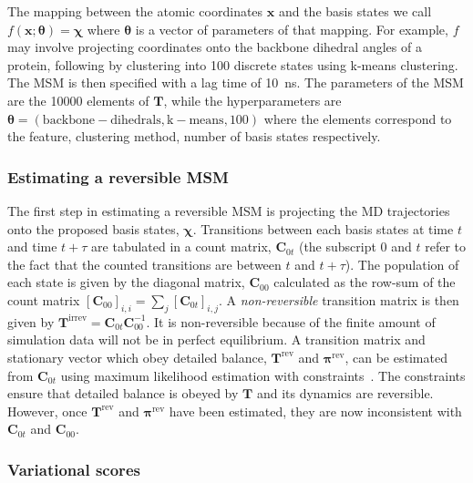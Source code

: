 \documentclass[journal=jacsat,manuscript=article]{achemso}
\begin{document}
The mapping between the atomic coordinates $\mathbf{x}$ and the basis states we call $f(\mathbf{x}; \bm{\theta}) =  \bm{\chi}$ where $\bm{\theta}$ is a vector of parameters of that mapping. For example, $f$ may involve projecting coordinates onto the backbone dihedral angles of a protein, following by clustering into \num{100} discrete states using k-means clustering. The MSM is then specified with a lag time of \SI{10}{\nano\second}. The parameters of the MSM are the \num{10000} elements of $\mathbf{T}$, while the hyperparameters are $\bm{\theta}=(\mathrm{backbone-dihedrals}, \mathrm{k-means}, 100)$ where the elements correspond to the feature, clustering method, number of basis states respectively.  

\subsubsection{Estimating a reversible MSM}

The first step in estimating a reversible MSM is projecting the MD trajectories onto the proposed basis states, $\bm{\chi}$. Transitions between each basis states at time $t$ and time $t + \tau$ are tabulated in a count matrix, $\mathbf{C}_{0t}$ (the subscript $0$ and $t$ refer to the fact that the counted transitions are between $t$ and $t+\tau$). The population of each state is given by the diagonal matrix, $\mathbf{C}_{00}$ calculated as the row-sum of the count matrix $[\mathbf{C}_{00}]_{i, i} = \sum_j [\mathbf{C}_{0t}]_{i, j}$.  A \emph{non-reversible} transition matrix is then given by $\mathbf{T}^{\mathrm{irrev}} = \mathbf{C}_{0t}\mathbf{C}_{00}^{-1}$. It is non-reversible because of the finite amount of simulation data will not be in perfect equilibrium. A transition matrix and stationary vector which obey detailed balance, $\mathbf{T}^{\mathrm{rev}}$ and $\bm{\pi}^{\mathrm{rev}}$, can be estimated from $\mathbf{C}_{0t}$ using maximum likelihood estimation with constraints~\cite{trendelkamp-schroer_estimation_2015}. The constraints ensure that detailed balance is obeyed by $\mathbf{T}$ and its dynamics are reversible.  However, once $\mathbf{T}^{\mathrm{rev}}$ and $\bm{\pi}^{\mathrm{rev}}$ have been estimated, they are now inconsistent with $\mathbf{C}_{0t}$ and $\mathbf{C}_{00}$. 

\subsubsection{Variational scores}
\end{document}
